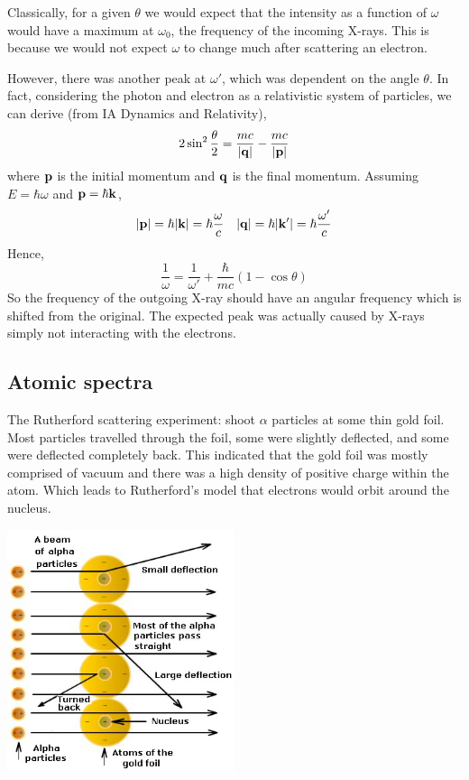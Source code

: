 \documentclass[a4paper,11pt]{article}
\begin{document}
Classically, for a given \( \theta \) we would expect that the intensity as a function of \( \omega \) would have a maximum at \( \omega_0 \), the frequency of the incoming X-rays.
This is because we would not expect \( \omega \) to change much after scattering an electron.

However, there was another peak at \( \omega' \), which was dependent on the angle \( \theta \).
In fact, considering the photon and electron as a relativistic system of particles, we can derive (from IA Dynamics and Relativity),
\[
	2 \sin^2 \frac{\theta}{2} = \frac{mc}{\abs{\vb q}} - \frac{mc}{\abs{\vb p}}
\]
where \( \vb p \) is the initial momentum and \( \vb q \) is the final momentum.
Assuming \( E = \hbar \omega \) and \( \vb p = \hbar \vb k \),
\[
	\abs{\vb p} = \hbar \abs{\vb k} = \hbar \frac{\omega}{c}\quad \abs{\vb q} = \hbar \abs{\vb k'} = \hbar\frac{\omega'}{c}
\]
Hence,
\[
	\frac{1}{\omega} = \frac{1}{\omega'} + \frac{\hbar}{mc}(1-\cos\theta)
\]
So the frequency of the outgoing X-ray should have an angular frequency which is shifted from the original.
The expected peak was actually caused by X-rays simply not interacting with the electrons.

\subsection{Atomic spectra}
The Rutherford scattering experiment: shoot \( \alpha \) particles at some thin gold foil.
Most particles travelled through the foil, some were slightly deflected, and some were deflected completely back.
This indicated that the gold foil was mostly comprised of vacuum and there was a high density of positive charge within the atom. 
Which leads to Rutherford's model that electrons would orbit around the nucleus.

\begin{center}
    \includegraphics[width=0.5\textwidth]{qm5.png}
\end{center}
\end{document}

